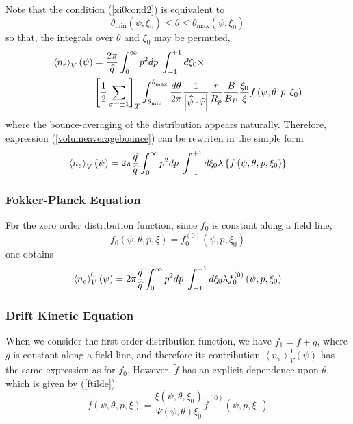 Note that the condition (\ref{xi0cond2}) is equivalent to
\begin{equation}
\theta_{\min}\left( \psi,\xi_{0}\right) \leq\theta\leq\theta_{\max}\left(
\psi,\xi_{0}\right)
\end{equation}
so that, the integrals over $\theta$ and $\xi_{0}$ may be permuted,
\begin{align}
\left\langle n_{e}\right\rangle _{V}\left( \psi\right) & =\frac{2\pi }{%
\widehat{q}}\int_{0}^{\infty}p^{2}dp\;\int_{-1}^{+1}d\xi_{0}\times  \nonumber
\\
& \left[ \frac{1}{2}\sum_{\sigma=\pm1}\right]
_{T}\int_{\theta_{\min}}^{\theta_{\max}}\frac{d\theta}{2\pi}\frac{1}{\left|
\widehat{\psi}\cdot\widehat{r}\right| }\frac{r}{R_{p}}\frac{B}{B_{P}}\frac{
\xi_{0}}{\xi }f\left( \psi,\theta,p,\xi_{0}\right)
\end{align}
where the bounce-averaging of the distribution appears naturally. Therefore,
expression (\ref{volumeaveragebounce}) can be rewriten in the simple form
\begin{equation}
\left\langle n_{e}\right\rangle _{V}\left( \psi\right) =2\pi\frac {%
\widetilde{q}}{\widehat{q}}\int_{0}^{\infty}p^{2}dp\;\int_{-1}^{+1}d\xi
_{0}\lambda\left\{ f\left( \psi,\theta,p,\xi_{0}\right) \right\}
\end{equation}

\subsubsection{Fokker-Planck Equation}

For the zero order distribution function, since $f_{0}$ is constant along a
field line,
\begin{equation}
f_{0}\left( \psi,\theta,p,\xi\right) =f_{0}^{(0)}\left( \psi,p,\xi
_{0}\right)
\end{equation}
one obtains
\begin{equation}
\left\langle n_{e}\right\rangle _{V}^{0}\left( \psi\right) =2\pi \frac{%
\widetilde{q}}{\widehat{q}}\int_{0}^{\infty}p^{2}dp\;\int_{-1}^{+1}d\xi_{0}%
\lambda f_{0}^{(0)}\left( \psi,p,\xi_{0}\right)
\end{equation}

\subsubsection{Drift Kinetic Equation}

When we consider the first order distribution function, we have $f_{1}=%
\widetilde{f}+g$, where $g$ is constant along a field line, and therefore
its contribution $\left\langle n_{e}\right\rangle _{V}^{1}\left( \psi\right)
$ has the same expression as for $f_{0}$. However, $\widetilde{f}$ has an
explicit dependence upon $\theta$, which is given by (\ref{ftilde})
\begin{equation}
\widetilde{f}(\psi,\theta,p,\xi)=\frac{\xi(\psi,\theta,\xi_{0})}{\Psi
(\psi,\theta)\xi_{0}}\widetilde{f}^{(0)}(\psi,p,\xi_{0})
\end{equation}

